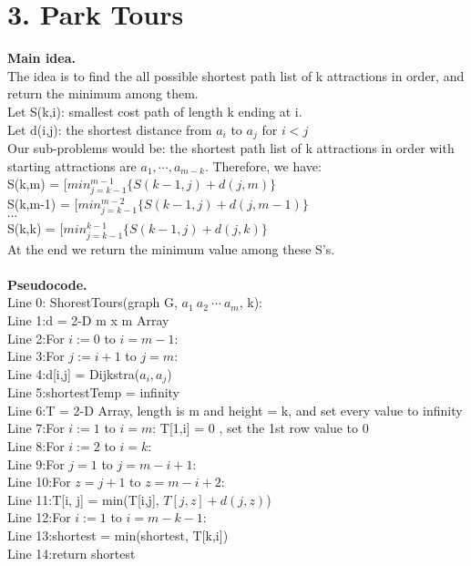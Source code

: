 \documentclass[11pt]{article}
\newcommand{\tab}{\hspace*{2em}}
\begin{document}
\section*{3. Park Tours}
\noindent
\textbf{Main idea.}\\
The idea is to find the all possible shortest path list of k attractions in order, and return the minimum among them. \\
Let S(k,i): smallest cost path of length k ending at i.\\
Let d(i,j): the shortest distance from $a_i$ to $a_j$ for $i < j$\\
Our sub-problems would be: the shortest path list of k attractions in order with starting attractions are $a_1, \cdots,a_{m-k}$. Therefore, we have:\\
S(k,m) = $\Big[min_{j = k-1}^{m-1} \Big\{ S(k - 1, j) + d(j,m) \Big\} $\\
S(k,m-1) = $\Big[min_{j = k-1}^{m-2} \Big\{ S(k - 1, j) + d(j,m-1) \Big\} $\\
$\cdots$\\
S(k,k) = $\Big[min_{j = k-1}^{k-1} \Big\{ S(k - 1, j) + d(j,k) \Big\} $\\
At the end we return the minimum value among these S's.\\
\\
\noindent
\textbf{Pseudocode.}\\
Line 0: ShorestTours(graph G, $a_1\ a_2\ \cdots\ a_m$, k):\\
Line 1:\tab d = 2-D m x m Array \\
Line 2:\tab For $i:= 0$ to $i=m - 1$:\\
Line 3:\tab\tab For $j:= i+1$ to $j=m$:\\
Line 4:\tab\tab\tab d[i,j] = Dijkstra($a_i, a_j$) \\ 
Line 5:\tab shortestTemp = infinity\\
Line 6:\tab T = 2-D Array, length is m and height = k, and set every value to infinity\\ 
Line 7:\tab For $i:= 1$ to $i = m$: T[1,i] = 0 , set the 1st row value to 0 \\
Line 8:\tab For $i:= 2$ to $i = k$:\\
Line 9:\tab\tab For $j = 1$ to $j = m - i + 1$:\\
Line 10:\tab\tab\tab For $z = j + 1$ to $z = m - i + 2$:\\
Line 11:\tab\tab\tab\tab T[i, j] = min(T[i,j], $T[j,z] + d(j,z)$)\\
Line 12:\tab For $i:= 1$ to $i = m - k - 1$:\\
Line 13:\tab\tab shortest = min(shortest, T[k,i])\\
Line 14:\tab return shortest\\
\end{document}
